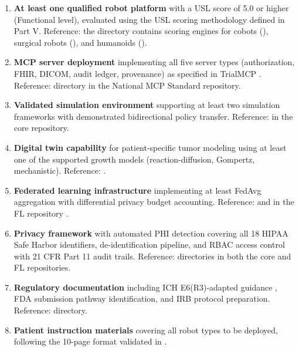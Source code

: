 \documentclass[11pt,letterpaper]{article}
\begin{document}
\begin{enumerate}
  \item \textbf{At least one qualified robot platform} with a USL score of 5.0 or higher (Functional level), evaluated using the USL scoring methodology defined in Part V. Reference: the  directory contains scoring engines for cobots (), surgical robots (), and humanoids ().

  \item \textbf{MCP server deployment} implementing all five server types (authorization, FHIR, DICOM, audit ledger, provenance) as specified in TrialMCP \cite{kawchak2026mcp}. Reference:  directory in the National MCP Standard repository.

  \item \textbf{Validated simulation environment} supporting at least two simulation frameworks with demonstrated bidirectional policy transfer. Reference:  in the core repository.

  \item \textbf{Digital twin capability} for patient-specific tumor modeling using at least one of the supported growth models (reaction-diffusion, Gompertz, mechanistic). Reference: .

  \item \textbf{Federated learning infrastructure} implementing at least FedAvg aggregation with differential privacy budget accounting. Reference:  and  in the FL repository \cite{kawchak2026fl}.

  \item \textbf{Privacy framework} with automated PHI detection covering all 18 HIPAA Safe Harbor identifiers, de-identification pipeline, and RBAC access control with 21 CFR Part 11 audit trails. Reference:  directories in both the core and FL repositories.

  \item \textbf{Regulatory documentation} including ICH E6(R3)-adapted guidance \cite{kawchak2026guidance}, FDA submission pathway identification, and IRB protocol preparation. Reference:  directory.

  \item \textbf{Patient instruction materials} covering all robot types to be deployed, following the 10-page format validated in \cite{kawchak2026patient}.
\end{enumerate}
\end{document}
